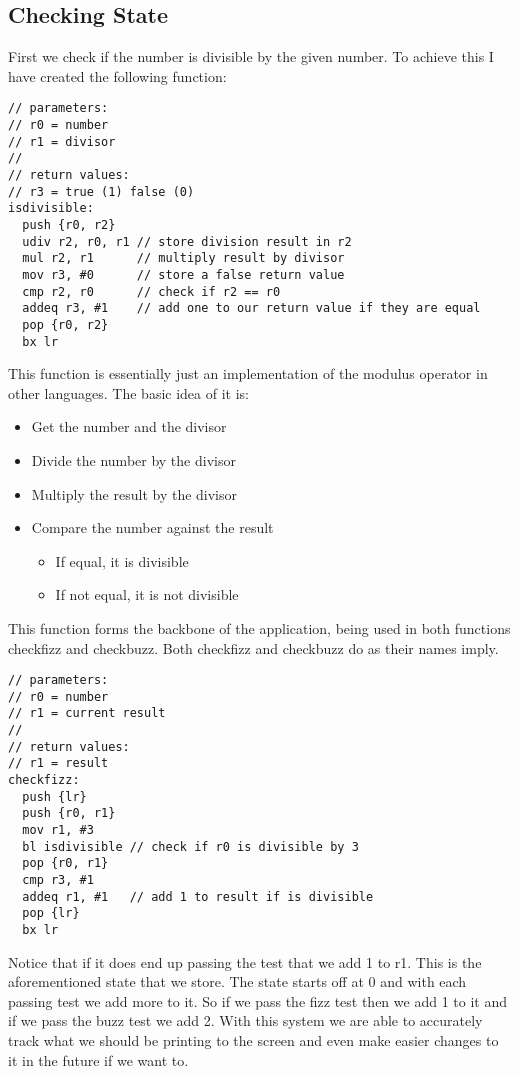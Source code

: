 \documentclass[11pt]{scrartcl}
\begin{document}
\subsection*{Checking State}
First we check if the number is divisible by the given number. To achieve
this I have created the following function:
\begin{verbatim}
// parameters:
// r0 = number
// r1 = divisor
//
// return values:
// r3 = true (1) false (0)
isdivisible:
  push {r0, r2}
  udiv r2, r0, r1 // store division result in r2
  mul r2, r1      // multiply result by divisor
  mov r3, #0      // store a false return value
  cmp r2, r0      // check if r2 == r0
  addeq r3, #1    // add one to our return value if they are equal
  pop {r0, r2}
  bx lr
\end{verbatim}
This function is essentially just an implementation of the modulus operator
in other languages. The basic idea of it is:
\begin{itemize}
    \item Get the number and the divisor
    \item Divide the number by the divisor
    \item Multiply the result by the divisor
    \item Compare the number against the result
    \begin{itemize}
        \item If equal, it is divisible
        \item If not equal, it is not divisible
    \end{itemize}
\end{itemize}
This function forms the backbone of the application, being used in both
functions checkfizz and checkbuzz. Both checkfizz and checkbuzz do as
their names imply.
\begin{verbatim}
// parameters:
// r0 = number
// r1 = current result
//
// return values:
// r1 = result
checkfizz:
  push {lr}
  push {r0, r1}
  mov r1, #3
  bl isdivisible // check if r0 is divisible by 3
  pop {r0, r1}
  cmp r3, #1
  addeq r1, #1   // add 1 to result if is divisible
  pop {lr}
  bx lr
\end{verbatim}
Notice that if it does end up passing the test that we add 1 to r1. This
is the aforementioned state that we store. The state starts off at 0 and
with each passing test we add more to it. So if we pass the fizz test then
we add 1 to it and if we pass the buzz test we add 2. With this system we
are able to accurately track what we should be printing to the screen and
even make easier changes to it in the future if we want to.
\end{document}

